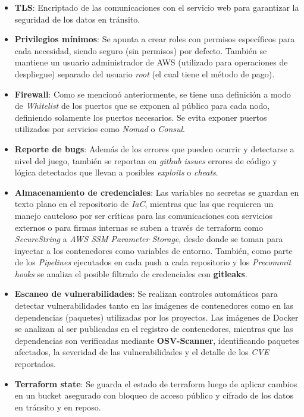 \begin{itemize}
    \item \textbf{TLS}: Encriptado de las comunicaciones con el servicio web para garantizar la seguridad
        de los datos en tránsito.
    \item \textbf{Privilegios mínimos}: Se apunta a crear roles con permisos específicos para cada necesidad,
        siendo seguro (sin permisos) por defecto. También se mantiene un usuario administrador de AWS (utilizado para operaciones de despliegue) separado del usuario
        \textit{root} (el cual tiene el método de pago).
    \item \textbf{Firewall}: Como se mencionó anteriormente, se tiene una definición a modo de \textit{Whitelist} de los puertos que se exponen al público para cada nodo,
        definiendo solamente los puertos necesarios. Se evita exponer puertos utilizados por servicios como \textit{Nomad} o \textit{Consul}.
    \item \textbf{Reporte de bugs}: Además de los errores que pueden ocurrir y detectarse a nivel del juego, también se reportan en \textit{github issues}
        errores de código y lógica detectados que llevan a posibles \textit{exploits} o \textit{cheats}.
    \item \textbf{Almacenamiento de credenciales}: Las variables no secretas se guardan en texto plano en el repositorio de \textit{IaC}, mientras que
        las que requieren un manejo cauteloso por ser críticas para las comunicaciones con servicios externos o para firmas internas se suben a través de
        terraform como \textit{SecureString} a \textit{AWS SSM Parameter Storage}, desde donde se toman para inyectar a los contenedores como variables de entorno.
        También, como parte de los \textit{Pipelines} ejecutados en cada push a cada repositorio y los \textit{Precommit hooks} se analiza el posible filtrado de credenciales con \textbf{gitleaks}.
    \item \textbf{Escaneo de vulnerabilidades}: Se realizan controles automáticos para detectar vulnerabilidades tanto en las imágenes de contenedores 
        como en las dependencias (paquetes)  utilizadas por los proyectos. 
        Las imágenes de Docker se analizan al ser publicadas en el registro de contenedores, mientras que las dependencias son verificadas mediante \textbf{OSV-Scanner},
        identificando paquetes afectados, la severidad de las vulnerabilidades y el detalle de los \textit{CVE} reportados.
    \item \textbf{Terraform state}: Se guarda el estado de terraform luego de aplicar cambios en un bucket asegurado con bloqueo de acceso público y cifrado de los datos
        en tránsito y en reposo.
\end{itemize}
